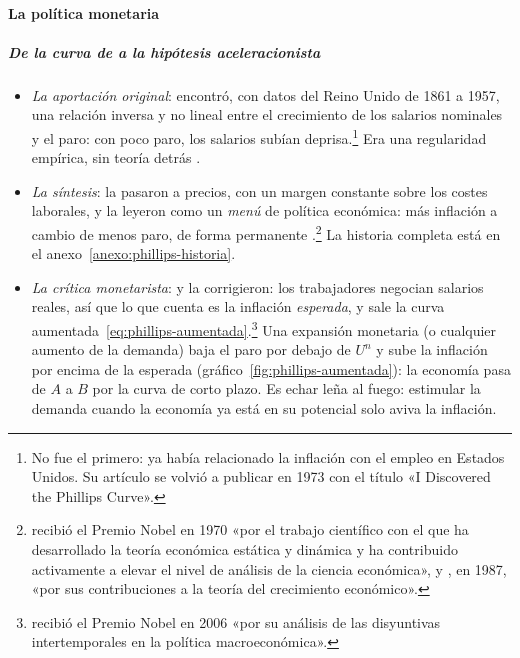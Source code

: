 \documentclass[11pt]{article}
\begin{document}
\paragraph{La política monetaria}\label{sec:politica-monetaria}

\subparagraph{De la curva de  a la hipótesis aceleracionista}

\begin{itemize}
\item \emph{La aportación original}: \textcite{Phillips1958} encontró, con datos del Reino Unido de 1861 a 1957, una relación inversa y no lineal entre el crecimiento de los salarios nominales y el paro: con poco paro, los salarios subían deprisa.\footnote{No fue el primero: \textcite{Fisher1926Statistical} ya había relacionado la inflación con el empleo en Estados Unidos. Su artículo se volvió a publicar en 1973 con el título «I Discovered the Phillips Curve»\nocite{Fisher1973Discovered}.} Era una regularidad empírica, sin teoría detrás .
\item \emph{La síntesis}: \textcite{SamuelsonSolow1960Analytical} la pasaron a precios, con un margen constante sobre los costes laborales, y la leyeron como un \emph{menú} de política económica: más inflación a cambio de menos paro, de forma permanente .\footnote{ recibió el Premio Nobel en 1970 «por el trabajo científico con el que ha desarrollado la teoría económica estática y dinámica y ha contribuido activamente a elevar el nivel de análisis de la ciencia económica»\nocite{Nobel1970Samuelson}, y , en 1987, «por sus contribuciones a la teoría del crecimiento económico»\nocite{Nobel1987Solow}.} La historia completa está en el anexo~\ref{anexo:phillips-historia}.
\item \emph{La crítica monetarista}: \textcite{Friedman1968Role} y \textcite{Phelps1967Phillips} la corrigieron: los trabajadores negocian salarios reales, así que lo que cuenta es la inflación \emph{esperada}, y sale la curva aumentada~\eqref{eq:phillips-aumentada}.\footnote{ recibió el Premio Nobel en 2006 «por su análisis de las disyuntivas intertemporales en la política macroeconómica»\nocite{Nobel2006Phelps}.} Una expansión monetaria (o cualquier aumento de la demanda) baja el paro por debajo de $U^n$ y sube la inflación por encima de la esperada (gráfico~\ref{fig:phillips-aumentada}): la economía pasa de $A$ a $B$ por la curva de corto plazo. Es echar leña al fuego: estimular la demanda cuando la economía ya está en su potencial solo aviva la inflación.

\end{itemize}
\end{document}

